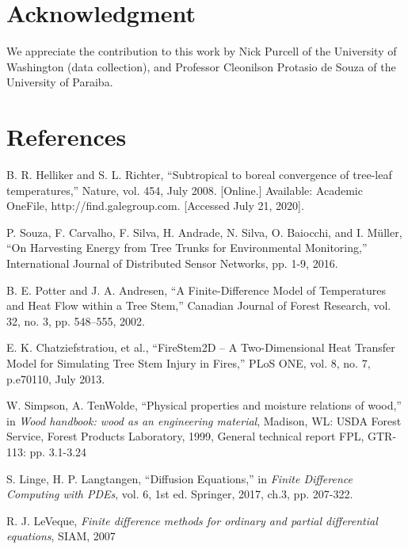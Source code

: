 \documentclass{IEEEtran} %
\begin{document}
\section*{Acknowledgment}
We appreciate the contribution to this work by Nick Purcell of the University of Washington (data collection), and Professor Cleonilson Protasio de Souza of the University of Paraiba.


\section*{References}
\begin{enumerate}[label={[\arabic*]}]

\item B. R. Helliker and S. L. Richter, “Subtropical to boreal convergence of tree-leaf temperatures,” Nature, vol. 454, July 2008. [Online.] Available: Academic OneFile, http://find.galegroup.com. [Accessed July 21, 2020]. \label{treeleaf}

\item P. Souza, F. Carvalho, F. Silva, H. Andrade, N. Silva, O. Baiocchi, and I. Müller, “On Harvesting Energy from Tree Trunks for Environmental Monitoring,” International Journal of Distributed Sensor Networks, pp. 1-9, 2016. \label{souza}

\item B. E. Potter and J. A. Andresen, “A Finite-Difference Model of Temperatures and Heat Flow within a Tree Stem,” Canadian Journal of Forest Research, vol. 32, no. 3, pp. 548–555, 2002.\label{potter_andresen}

\item  E. K. Chatziefstratiou, et al., “FireStem2D – A Two-Dimensional Heat Transfer Model for Simulating Tree Stem Injury in Fires,” PLoS ONE, vol. 8, no. 7, p.e70110, July 2013.\label{firestem2d}

\item W. Simpson, A. TenWolde, “Physical properties and moisture relations of wood,” in \textit{Wood handbook: wood as an engineering material}, Madison, WL: USDA Forest Service, Forest Products Laboratory, 1999, General technical report FPL, GTR-113: pp. 3.1-3.24\label{parameter} 

\item S. Linge, H. P. Langtangen, “Diffusion Equations,” in \textit{Finite Difference Computing with PDEs}, vol. 6, 1st ed. Springer, 2017, ch.3, pp. 207-322.\label{2017book}

\item R. J. LeVeque, \textit{ Finite difference methods for ordinary and partial differential equations}, SIAM, 2007\label{leveque} 


\end{enumerate}
\end{document}

